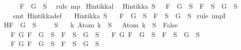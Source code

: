 \begin{isabellebody}
\ \ \ \ \isamarkupfalse%
\ {\isacartoucheopen}F\ \isactrlbold {\isasymand}\ G\ {\isasymin}\ S{\isacartoucheclose}\ \isamarkupfalse%
\ {\isacharparenleft}rule\ mp{\isacharparenright}\isanewline
{}\isamarkupfalse%
%
\endisatagproof
{\isafoldproof}%
%
\isadelimproof
\isanewline
%
\endisadelimproof
\isanewline
{}\isamarkupfalse%
\ Hintikka{\isacharunderscore}l{}{\isacharcolon}\ \isanewline
\ {\isachardoublequoteopen}Hintikka\ S\ {\isasymLongrightarrow}\ \ {\isacharparenleft}F\ \isactrlbold {\isasymand}\ G\ {\isasymin}\ S\ {\isasymlongrightarrow}\ F\ {\isasymin}\ S\ {\isasymand}\ G\ {\isasymin}\ S{\isacharparenright}{\isachardoublequoteclose}\isanewline
%
\isadelimproof
\ \ %
\endisadelimproof
%
\isatagproof
{}\isamarkupfalse%
\ {\isacharparenleft}smt\ Hintikka{\isacharunderscore}def{\isacharparenright}%
\endisatagproof
{\isafoldproof}%
%
\isadelimproof
\isanewline
%
\endisadelimproof
\isanewline
{}\isamarkupfalse%
\isanewline
\ \ \ {\isachardoublequoteopen}Hintikka\ S{\isachardoublequoteclose}\isanewline
\ \ \ {\isachardoublequoteopen}F\ \isactrlbold {\isasymor}\ G\ {\isasymin}\ S\ {\isasymlongrightarrow}\ F\ {\isasymin}\ S\ {\isasymor}\ G\ {\isasymin}\ S{\isachardoublequoteclose}\isanewline
%
\isadelimproof
%
\endisadelimproof
%
\isatagproof
{}\isamarkupfalse%
\ {\isacharparenleft}rule\ impI{\isacharparenright}\isanewline
\ \ \isamarkupfalse%
\ H{\isacharcolon}{\isachardoublequoteopen}F\ \isactrlbold {\isasymor}\ G\ {\isasymin}\ S{\isachardoublequoteclose}\isanewline
\ \isamarkupfalse%
\ {\isachardoublequoteopen}{\isasymbottom}\ {\isasymnotin}\ S\isanewline
\ \ {\isasymand}\ {\isacharparenleft}{\isasymforall}k{\isachardot}\ Atom\ k\ {\isasymin}\ S\ {\isasymlongrightarrow}\ \isactrlbold {\isasymnot}\ {\isacharparenleft}Atom\ k{\isacharparenright}\ {\isasymin}\ S\ {\isasymlongrightarrow}\ False{\isacharparenright}\isanewline
\ \ {\isasymand}\ {\isacharparenleft}{\isasymforall}F\ G{\isachardot}\ F\ \isactrlbold {\isasymand}\ G\ {\isasymin}\ S\ {\isasymlongrightarrow}\ F\ {\isasymin}\ S\ {\isasymand}\ G\ {\isasymin}\ S{\isacharparenright}\isanewline
\ \ {\isasymand}\ {\isacharparenleft}{\isasymforall}F\ G{\isachardot}\ F\ \isactrlbold {\isasymor}\ G\ {\isasymin}\ S\ {\isasymlongrightarrow}\ F\ {\isasymin}\ S\ {\isasymor}\ G\ {\isasymin}\ S{\isacharparenright}\isanewline
\ \ {\isasymand}\ {\isacharparenleft}{\isasymforall}F\ G{\isachardot}\ F\ \isactrlbold {\isasymrightarrow}\ G\ {\isasymin}\ S\ {\isasymlongrightarrow}\ \isactrlbold {\isasymnot}F\ {\isasymin}\ S\ {\isasymor}\ G\ {\isasymin}\ S{\isacharparenright}\isanewline

\end{isabellebody}
